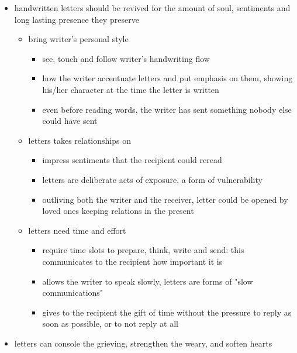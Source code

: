 \begin{itemize}
    \item handwritten letters should be revived for the amount of soul, sentiments and
            long lasting presence they preserve

    \begin{itemize}
        
        \item bring writer's personal style

            \begin{itemize}
                \item see, touch and follow writer's handwriting flow
                \item how the writer accentuate letters and put emphasis on them, showing his/her 
                        character at the time the letter is written
                \item even before reading words, the writer has sent something nobody else 
                        could have sent
            \end{itemize}

        \item letters takes relationships on

            \begin{itemize}
                \item impress sentiments that the recipient could reread
                \item letters are deliberate acts of exposure, a form of vulnerability
                \item outliving both the writer and the receiver, letter could
                        be opened by loved ones keeping relations in the present
            \end{itemize}

        \item letters need time and effort

            \begin{itemize}
                \item require time slots to prepare, think, write and send: this
                        communicates to the recipient how important it is
                \item allows the writer to speak slowly, letters are forms of "slow communications"
                \item gives to the recipient the gift of time without the pressure to reply
                        as soon as possible, or to not reply at all
            \end{itemize}

    \end{itemize}

    \item letters can console the grieving, strengthen the weary, and soften hearts
\end{itemize}

